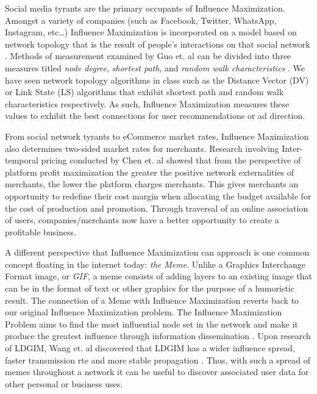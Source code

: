 \documentclass[12pt]{article}
\begin{document}
Social media tyrants are the primary occupants of Influence Maximization. 
Amongst a variety of companies (such as Facebook, Twitter, WhatsApp, Instagram, etc\ldots) Influence Maximization is incorporated on a model based on network topology that is the result of people's interactions on that social network \cite{9045797}. 
Methods of measurement examined by Guo et. al can be divided into three measures titled \emph{node degree}, \emph{shortest path}, and \emph{random walk characteristics} \cite{9045797}. 
We have seen network topology algorithms in class such as the Distance Vector (DV) or Link State (LS) algorithms that exhibit shortest path and random walk characteristics respectively. 
As such, Influence Maximization measures these values to exhibit the best connections for user recommendations or ad direction.

From social network tyrants to eCommerce market rates, Influence Maximization also determines two-sided market rates for merchants. 
Research involving Inter-temporal pricing conducted by Chen et. al \cite{9188557} showed that from the perspective of platform profit maximization the greater the positive network externalities of merchants, the lower the platform charges merchants. 
This gives merchants an opportunity to redefine their cost margin when allocating the budget available for the cost of production and promotion. 
Through traversal of an online association of users, companies/merchants now have a better opportunity to create a profitable business.

A different perspective that Influence Maximization can approach is one common concept floating in the internet today: \emph{the Meme}. 
Unlike a Graphics Interchange Format image, or \emph{GIF}, a meme consists of adding layers to an existing image that can be in the format of text or other graphics for the purpose of a humoristic result. 
The connection of a Meme with Influence Maximization reverts back to our original Influence Maximization problem. 
The Influence Maximization Problem aims to find the most influential node set in the network and make it produce the greatest influence through information dissemination \cite{9695654}. 
Upon research of LDGIM, Wang et. al discovered that LDGIM has a wider influence spread, faster transmission rte and more stable propagation \cite{9695654}. 
Thus, with such a spread of memes throughout a network it can be useful to discover associated user data for other personal or business uses.



\begin{thebibliography}{99}	%
\nocite{*}

\end{thebibliography}
\end{document}
